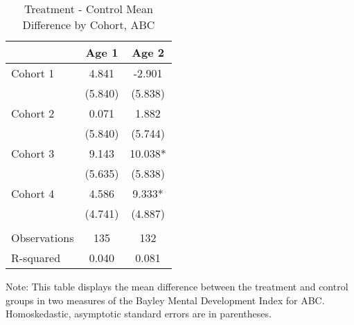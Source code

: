 \begin{table}[H] 
\centering 
\begin{threeparttable}
\caption{Treatment - Control Mean Difference by Cohort, ABC}
\label{table:cohorts}
\begin{tabular}{lcc} \toprule
 & Age 1 & Age 2 \\
 \midrule
Cohort 1 & 4.841 & -2.901 \\
 & (5.840) & (5.838) \\
Cohort 2 & 0.071 & 1.882 \\
 & (5.840) & (5.744) \\
Cohort 3 & 9.143 & 10.038* \\
 & (5.635) & (5.838) \\
Cohort 4 & 4.586 & 9.333* \\
 & (4.741) & (4.887) \\
 &  &  \\
 \midrule
Observations & 135 & 132 \\
 R-squared & 0.040 & 0.081 \\ 
 \bottomrule
 \end{tabular}
\begin{tablenotes}
\footnotesize 
\item Note: This table displays the mean difference between the treatment and control groups in two measures of the Bayley Mental Development Index for ABC. Homoskedastic, asymptotic standard errors are in parentheses.
\end{tablenotes}
\end{threeparttable}
\end{table}
